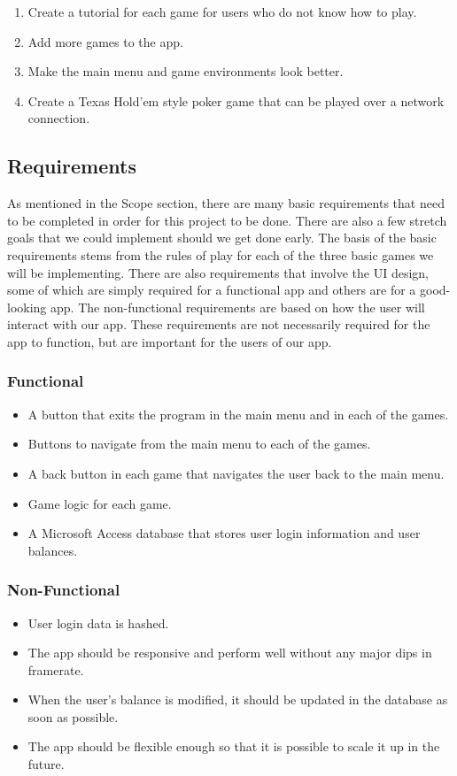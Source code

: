 \documentclass[10pt,conference,onecolumn,compsoc]{IEEEtran}
\begin{document}
\begin{enumerate}
\item Create a tutorial for each game for users who do not know how to play.
\item Add more games to the app.
\item Make the main menu and game environments look better.
\item Create a Texas Hold'em style poker game that can be played over a network connection.
\end{enumerate}

\subsection{Requirements}
As mentioned in the Scope section, there are many basic requirements that need to be completed in order for this project to be done. There are also a few stretch goals that we could implement should we get done early. The basis of the basic requirements stems from the rules of play for each of the three basic games we will be implementing. There are also requirements that involve the UI design, some of which are simply required for a functional app and others are for a good-looking app. The non-functional requirements are based on how the user will interact with our app. These requirements are not necessarily required for the app to function, but are important for the users of our app.

\subsubsection{Functional}
\begin{itemize}
\item A button that exits the program in the main menu and in each of the games.
\item Buttons to navigate from the main menu to each of the games.
\item A back button in each game that navigates the user back to the main menu.
\item Game logic for each game.
\item A Microsoft Access database that stores user login information and user balances.
\end{itemize}

\subsubsection{Non-Functional}
\begin{itemize}
\item User login data is hashed.
\item The app should be responsive and perform well without any major dips in framerate.
\item When the user's balance is modified, it should be updated in the database as soon as possible.
\item The app should be flexible enough so that it is possible to scale it up in the future.
\end{itemize}
\end{document}
